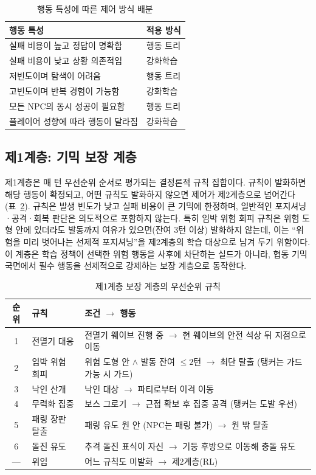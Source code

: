 \documentclass[12pt]{article}      %
\begin{document}
\begin{table}[t]
\caption{행동 특성에 따른 제어 방식 배분}
\label{tab:criteria}
\begin{tabularx}{\textwidth}{Xl}
\toprule
행동 특성 & 적용 방식 \\
\midrule
실패 비용이 높고 정답이 명확함 & 행동 트리 \\
실패 비용이 낮고 상황 의존적임 & 강화학습 \\
저빈도이며 탐색이 어려움 & 행동 트리 \\
고빈도이며 반복 경험이 가능함 & 강화학습 \\
모든 NPC의 동시 성공이 필요함 & 행동 트리 \\
플레이어 성향에 따라 행동이 달라짐 & 강화학습 \\
\bottomrule
\end{tabularx}
\end{table}

\subsection{제1계층: 기믹 보장 계층}

제1계층은 매 턴 우선순위 순서로 평가되는 결정론적 규칙 집합이다. 규칙이 발화하면
해당 행동이 확정되고, 어떤 규칙도 발화하지 않으면 제어가 제2계층으로 넘어간다
(표~\ref{tab:bt}). 규칙은 발생 빈도가 낮고 실패 비용이 큰 기믹에 한정하며,
일반적인 포지셔닝·공격·회복 판단은 의도적으로 포함하지 않는다. 특히 임박 위험
회피 규칙은 위험 도형 안에 있더라도 발동까지 여유가 있으면(잔여 3턴 이상) 발화하지
않는데, 이는 ``위험을 미리 벗어나는 선제적 포지셔닝''을 제2계층의 학습 대상으로
남겨 두기 위함이다. 이 계층은 학습 정책이 선택한 위험 행동을 사후에 차단하는
실드가 아니라, 협동 기믹 국면에서 필수 행동을 선제적으로 강제하는 보장
계층으로 동작한다.

\begin{table}[t]
\caption{제1계층 보장 계층의 우선순위 규칙}
\label{tab:bt}
\begin{tabularx}{\textwidth}{clX}
\toprule
순위 & 규칙 & 조건 $\rightarrow$ 행동 \\
\midrule
1 & 전멸기 대응 & 전멸기 웨이브 진행 중 $\rightarrow$ 현 웨이브의 안전 석상 뒤 지점으로 이동 \\
2 & 임박 위험 회피 & 위험 도형 안 $\wedge$ 발동 잔여 $\le 2$턴 $\rightarrow$ 최단 탈출
    (탱커는 가드 가능 시 가드) \\
3 & 낙인 산개 & 낙인 대상 $\rightarrow$ 파티로부터 이격 이동 \\
4 & 무력화 집중 & 보스 그로기 $\rightarrow$ 근접 확보 후 집중 공격 (탱커는 도발 우선) \\
5 & 패링 장판 탈출 & 패링 유도 원 안 (NPC는 패링 불가) $\rightarrow$ 원 밖 탈출 \\
6 & 돌진 유도 & 추격 돌진 표식이 자신 $\rightarrow$ 기둥 후방으로 이동해 충돌 유도 \\
--- & 위임 & 어느 규칙도 미발화 $\rightarrow$ 제2계층(RL) \\
\bottomrule
\end{tabularx}
\end{table}
\end{document}
